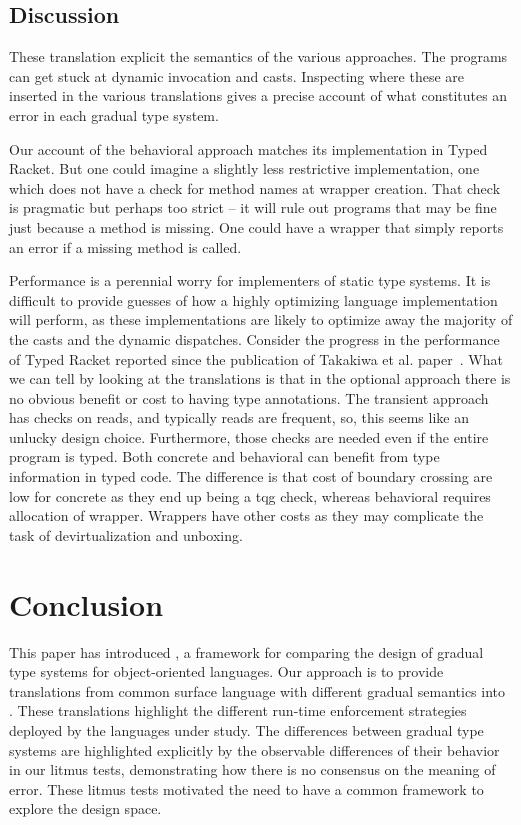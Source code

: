\documentclass[USenglish]{tex/lipics-v2016}
\begin{document}
\subsection{Discussion}

These translation explicit the semantics of the various approaches.  The
programs can get stuck at dynamic invocation and casts. Inspecting where
these are inserted in the various translations gives a precise account of
what constitutes an error in each gradual type system.

Our account of the behavioral approach matches its implementation in Typed
Racket. But one could imagine a slightly less restrictive implementation,
one which does not have a check for method names at wrapper creation.  That
check is pragmatic but perhaps too strict -- it will rule out programs that
may be fine just because a method is missing. One could have a wrapper that
simply reports an error if a missing method is called.

Performance is a perennial worry for implementers of static type systems.
It is difficult to provide guesses of how a highly optimizing language
implementation will perform, as these implementations are likely to optimize
away the majority of the casts and the dynamic dispatches. Consider the
progress in the performance of Typed Racket reported since the publication
of Takakiwa et al. paper~\cite{popl16}.  What we can tell by looking at the
translations is that in the optional approach there is no obvious benefit or
cost to having type annotations. The transient approach has checks on reads,
and typically reads are frequent, so, this seems like an unlucky design
choice. Furthermore, those checks are needed even if the entire program is
typed. Both concrete and behavioral can benefit from type information in
typed code.  The difference is that cost of boundary crossing are low for
concrete as they end up being a tqg check, whereas behavioral requires
allocation of wrapper. Wrappers have other costs as they may complicate
the task of devirtualization and unboxing.


\section{Conclusion}

This paper has introduced \kafka, a framework for comparing the design of
gradual type systems for object-oriented languages. Our approach is to
provide translations from common surface language with different gradual
semantics into \kafka. These translations highlight the different run-time
enforcement strategies deployed by the languages under study. The
differences between gradual type systems are highlighted explicitly by the
observable differences of their behavior in our litmus tests, demonstrating
how there is no consensus on the meaning of error.  These litmus tests
motivated the need to have a common framework to explore the design space.
\end{document}
